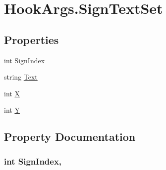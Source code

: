 \hypertarget{structOTA_1_1Plugin_1_1HookArgs_1_1SignTextSet}{}\section{Hook\+Args.\+Sign\+Text\+Set}
\label{structOTA_1_1Plugin_1_1HookArgs_1_1SignTextSet}
\subsection*{Properties}
\begin{DoxyCompactItemize}
\item 
int \hyperlink{structOTA_1_1Plugin_1_1HookArgs_1_1SignTextSet_a531652b61ae2a8227c47b07f0ac33804}{Sign\+Index}
\item 
string \hyperlink{structOTA_1_1Plugin_1_1HookArgs_1_1SignTextSet_ab4726c7c06ae41233e679361293b4173}{Text}
\item 
int \hyperlink{structOTA_1_1Plugin_1_1HookArgs_1_1SignTextSet_a80c0944640e62d3ed6c5419c1bcc0c88}{X}
\item 
int \hyperlink{structOTA_1_1Plugin_1_1HookArgs_1_1SignTextSet_aa482c4cc86a24474e4fb19b5b5978778}{Y}
\end{DoxyCompactItemize}


\subsection{Property Documentation}
\hypertarget{structOTA_1_1Plugin_1_1HookArgs_1_1SignTextSet_a531652b61ae2a8227c47b07f0ac33804}{}
\subsubsection[{Sign\+Index}]{\setlength{\rightskip}{0pt plus 5cm}int Sign\+Index\hspace{0.3cm}{\ttfamily [get]}, {\ttfamily [set]}}\label{structOTA_1_1Plugin_1_1HookArgs_1_1SignTextSet_a531652b61ae2a8227c47b07f0ac33804}
\hypertarget{structOTA_1_1Plugin_1_1HookArgs_1_1SignTextSet_ab4726c7c06ae41233e679361293b4173}{}
